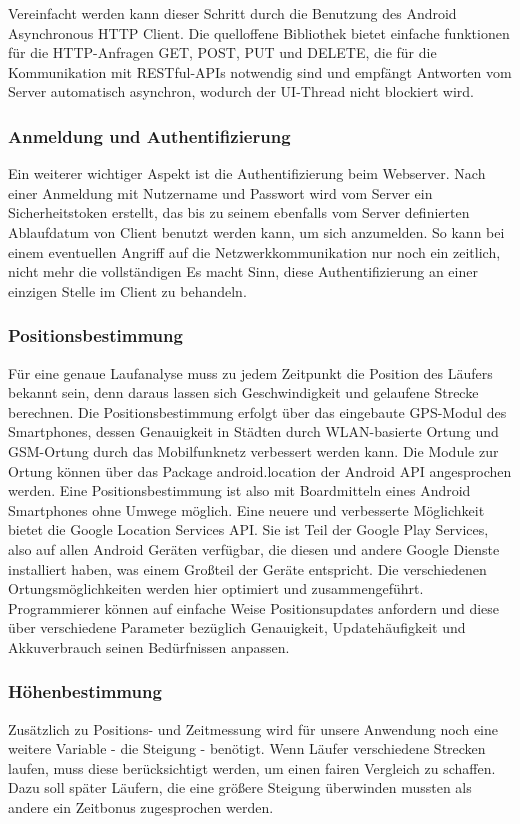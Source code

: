 Vereinfacht werden kann dieser Schritt durch die Benutzung des Android Asynchronous HTTP Client. Die quelloffene Bibliothek bietet einfache funktionen für die HTTP-Anfragen GET, POST, PUT und DELETE, die für die Kommunikation mit RESTful-APIs notwendig sind und empfängt Antworten vom Server automatisch asynchron, wodurch der UI-Thread nicht blockiert wird. \cite{loopj}
\subsubsection{Anmeldung und Authentifizierung}
Ein weiterer wichtiger Aspekt ist die Authentifizierung beim Webserver. Nach einer Anmeldung mit Nutzername und Passwort wird vom Server ein Sicherheitstoken erstellt, das bis zu seinem ebenfalls vom Server definierten Ablaufdatum von Client benutzt werden kann, um sich anzumelden. So kann bei einem eventuellen Angriff auf die Netzwerkkommunikation nur noch ein zeitlich, nicht mehr die vollständigen
Es macht Sinn, diese Authentifizierung an einer einzigen Stelle im Client zu behandeln.
\subsubsection{Positionsbestimmung}
Für eine genaue Laufanalyse muss zu jedem Zeitpunkt die Position des Läufers bekannt sein, denn daraus lassen sich Geschwindigkeit und gelaufene Strecke berechnen. Die Positionsbestimmung erfolgt über das eingebaute GPS-Modul des Smartphones, dessen Genauigkeit in Städten durch WLAN-basierte Ortung und GSM-Ortung durch das Mobilfunknetz verbessert werden kann. Die Module zur Ortung können über das Package android.location der Android API angesprochen werden. Eine Positionsbestimmung ist also mit Boardmitteln eines Android Smartphones ohne Umwege möglich. Eine neuere und verbesserte Möglichkeit bietet die Google Location Services API. Sie ist Teil der Google Play Services, also auf allen Android Geräten verfügbar, die diesen und andere Google Dienste installiert haben, was einem Großteil der Geräte entspricht. Die verschiedenen Ortungsmöglichkeiten werden hier optimiert und zusammengeführt. Programmierer können auf einfache Weise Positionsupdates anfordern und diese über verschiedene Parameter bezüglich Genauigkeit, Updatehäufigkeit und Akkuverbrauch seinen Bedürfnissen anpassen. \cite{androidlocation}
\subsubsection{Höhenbestimmung}
Zusätzlich zu Positions- und Zeitmessung wird für unsere Anwendung noch eine weitere Variable - die Steigung - benötigt. Wenn Läufer verschiedene Strecken laufen, muss diese berücksichtigt werden, um einen fairen Vergleich zu schaffen. Dazu soll später Läufern, die eine größere Steigung überwinden mussten als andere ein Zeitbonus zugesprochen werden.

